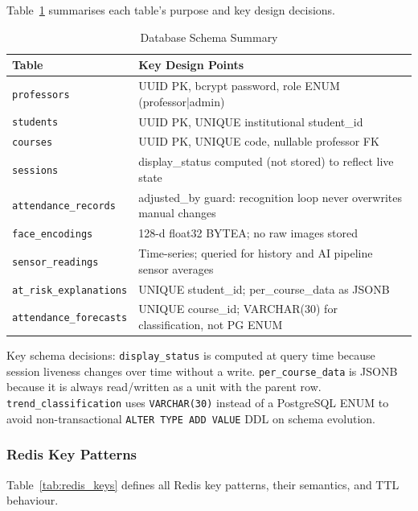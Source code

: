 Table~\ref{tab:db_schema} summarises each table's purpose and key
design decisions.

\begin{table}[H]
\centering
\caption{Database Schema Summary}
\label{tab:db_schema}
\begin{tabular}{@{}p{2.5cm}p{5.0cm}@{}}
\toprule
\textbf{Table} & \textbf{Key Design Points} \\
\midrule
\texttt{professors}        & UUID PK, bcrypt password, role ENUM (professor|admin) \\
\texttt{students}          & UUID PK, UNIQUE institutional student\_id \\
\texttt{courses}           & UUID PK, UNIQUE code, nullable professor FK \\
\texttt{sessions}          & display\_status computed (not stored) to reflect live state \\
\texttt{attendance\_records} & adjusted\_by guard: recognition loop never overwrites manual changes \\
\texttt{face\_encodings}   & 128-d float32 BYTEA; no raw images stored \\
\texttt{sensor\_readings}  & Time-series; queried for history and AI pipeline sensor averages \\
\texttt{at\_risk\_explanations} & UNIQUE student\_id; per\_course\_data as JSONB \\
\texttt{attendance\_forecasts} & UNIQUE course\_id; VARCHAR(30) for classification, not PG ENUM \\
\bottomrule
\end{tabular}
\end{table}

Key schema decisions: \texttt{display\_status} is computed at query time
because session liveness changes over time without a write.
\texttt{per\_course\_data} is JSONB because it is always read/written as
a unit with the parent row.  \texttt{trend\_classification} uses
\texttt{VARCHAR(30)} instead of a PostgreSQL ENUM to avoid
non-transactional \texttt{ALTER TYPE ADD VALUE} DDL on schema evolution.

\subsubsection{Redis Key Patterns}
Table~\ref{tab:redis_keys} defines all Redis key patterns, their
semantics, and TTL behaviour.

